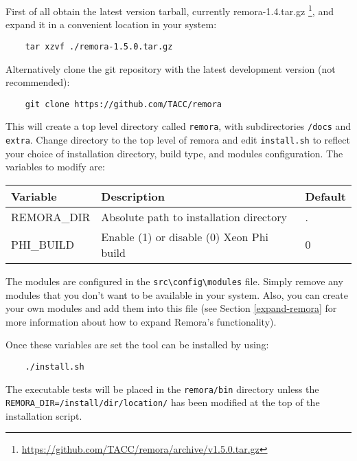 \documentclass[10pt,a4paper]{report}
\begin{document}
First of all obtain the latest version tarball, currently remora-1.4.tar.gz \footnote{\href{https://github.com/TACC/remora/archive/v1.5.0.tar.gz}{https://github.com/TACC/remora/archive/v1.5.0.tar.gz}}, and expand it in a convenient location in your system:

\begin{verbatim}
    tar xzvf ./remora-1.5.0.tar.gz
\end{verbatim}

Alternatively clone the git repository with the latest development version (not recommended):

\begin{verbatim}
    git clone https://github.com/TACC/remora
\end{verbatim}

This will create a top level directory called \verb+remora+, with subdirectories \verb+/docs+ and \verb+extra+. Change directory to the top level of remora and edit \verb+install.sh+ to reflect your choice of installation directory, build type, and modules configuration. The variables to modify are:

\begin{table}[h]
\centering
\label{tab:env}
\begin{tabular}{|l|l|l|}
\hline
\bf{Variable}	& \bf{Description}                          & \bf{Default}\\\hline
REMORA\_DIR     & Absolute path to installation directory   & . \\\hline
PHI\_BUILD      & Enable (1) or disable (0) Xeon Phi build  & 0 \\\hline
\end{tabular}
\end{table}

The modules are configured in the \verb+src\config\modules+ file. Simply remove any modules that you don't want to be available in your system. Also, you can create your own modules and add them into this file (see Section \ref{expand-remora} for more information about how to expand Remora's functionality).

Once these variables are set the tool can be installed by using:

\begin{verbatim}
    ./install.sh
\end{verbatim}

The executable tests will be placed in the \verb+remora/bin+ directory unless the \verb+REMORA_DIR=/install/dir/location/+ has been modified at the top of the installation script. 
\end{document}

